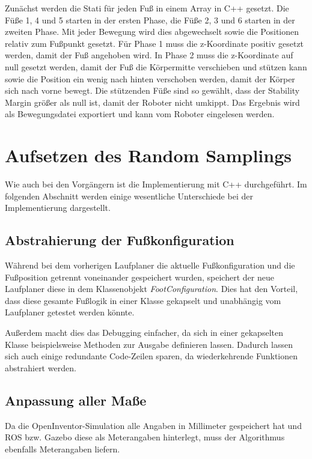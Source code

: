 \begin{itemize}
Zunächst werden die Stati für jeden Fuß in einem Array in C++ gesetzt. Die Füße 1, 4 und 5 starten in der ersten Phase, die Füße 2, 3 und 6 starten in der zweiten Phase. Mit jeder Bewegung wird dies abgewechselt sowie die Positionen relativ zum Fußpunkt gesetzt. Für Phase 1 muss die z-Koordinate positiv gesetzt werden, damit der Fuß angehoben wird. In Phase 2 muss die z-Koordinate auf null gesetzt werden, damit der Fuß die Körpermitte verschieben und stützen kann sowie die Position ein wenig nach hinten verschoben werden, damit der Körper sich nach vorne bewegt. Die stützenden Füße sind so gewählt, dass der Stability Margin größer als null ist, damit der Roboter nicht umkippt. Das Ergebnis wird als Bewegungsdatei exportiert und kann vom Roboter eingelesen werden.

\section{Aufsetzen des Random Samplings}

Wie auch bei den Vorgängern ist die Implementierung mit C++ durchgeführt. Im folgenden Abschnitt werden einige wesentliche Unterschiede bei der Implementierung dargestellt.

\subsection{Abstrahierung der Fußkonfiguration}

Während bei dem vorherigen Laufplaner die aktuelle Fußkonfiguration und die Fußposition getrennt voneinander gespeichert wurden, speichert der neue Laufplaner diese in dem Klassenobjekt \emph{FootConfiguration}. Dies hat den Vorteil, dass diese gesamte Fußlogik in einer Klasse gekapselt und unabhängig vom Laufplaner getestet werden könnte.

Außerdem macht dies das Debugging einfacher, da sich in einer gekapselten Klasse beispielsweise Methoden zur Ausgabe definieren lassen. Dadurch lassen sich auch einige redundante Code-Zeilen sparen, da wiederkehrende Funktionen abstrahiert werden.

\subsection{Anpassung aller Maße}

Da die OpenInventor-Simulation alle Angaben in Millimeter gespeichert hat und \ac{ROS} bzw. Gazebo diese als Meterangaben hinterlegt, muss der Algorithmus ebenfalls Meterangaben liefern.


\end{itemize}
